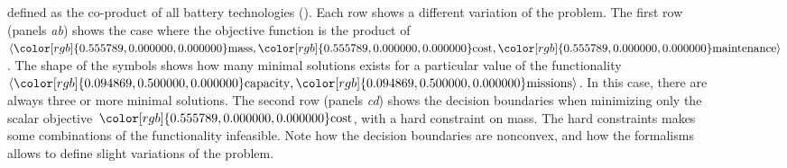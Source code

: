 \documentclass[twocolumn,english]{IEEEtran}
\theoremstyle{definition}
\theoremstyle{plain}
\theoremstyle{definition}
\theoremstyle{remark}
\theoremstyle{definition}
\theoremstyle{plain}
\theoremstyle{plain}
\newcommand{\colR}{\color[rgb]{0.555789,0.000000,0.000000}}
\newcommand{\colF}{\color[rgb]{0.094869,0.500000,0.000000}}
\newcommand{\R}[1]{{\colR #1}}
\newcommand{\F}[1]{{\colF #1}}
\begin{document}
\begin{figure}
{defined as the co-product of all battery technologies ().
Each row shows a different variation of the problem. The first row
(panels \emph{a}\textendash \emph{b}) shows the case where the objective
function is the product of~$\left\langle \R{\text{mass}},\R{\text{cost}},\R{\text{maintenance}}\right\rangle $.
The shape of the symbols shows how many minimal solutions exists for
a particular value of the functionality~$\left\langle \F{\text{capacity}},\F{\text{missions}}\right\rangle $.
In this case, there are always three or more minimal solutions. The
second row (panels \emph{c}\textendash \emph{d}) shows the decision
boundaries when minimizing only the scalar objective~$\R{\text{cost}}$,
with a hard constraint on \R{mass}. The hard constraints makes some
combinations of the functionality infeasible. Note how the decision
boundaries are nonconvex, and how the formalisms allows to define
slight variations of the problem.}
\end{figure}
\end{document}
